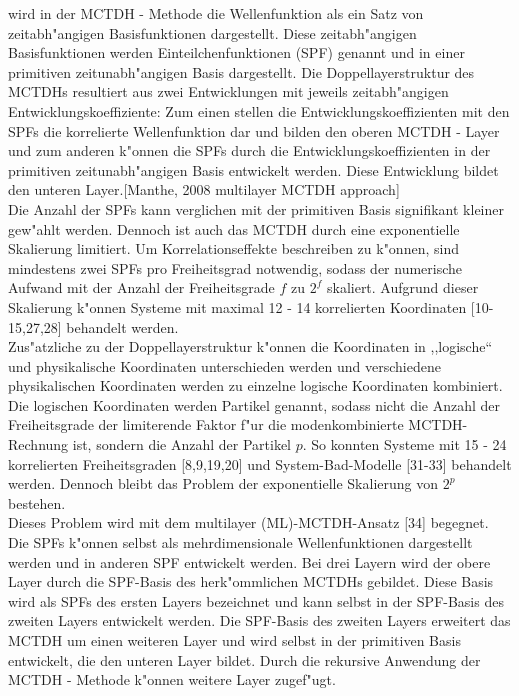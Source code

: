 wird in der MCTDH - Methode die Wellenfunktion als ein Satz von zeitabh"angigen Basisfunktionen dargestellt.
Diese zeitabh"angigen Basisfunktionen werden Einteilchenfunktionen (SPF) genannt und in einer primitiven zeitunabh"angigen Basis dargestellt.
Die Doppellayerstruktur des MCTDHs resultiert aus zwei Entwicklungen mit jeweils zeitabh"angigen Entwicklungskoeffiziente:
Zum einen stellen die Entwicklungskoeffizienten mit den SPFs die korrelierte Wellenfunktion dar und bilden den oberen MCTDH -
Layer und zum anderen k"onnen die SPFs durch die Entwicklungskoeffizienten in der primitiven zeitunabh"angigen Basis entwickelt werden. Diese Entwicklung bildet
den unteren Layer.[Manthe, 2008 multilayer MCTDH approach]
  \\ Die Anzahl der SPFs kann verglichen mit der primitiven Basis signifikant kleiner gew"ahlt werden.
Dennoch ist auch das MCTDH durch eine exponentielle Skalierung limitiert.
Um Korrelationseffekte beschreiben zu k"onnen, sind mindestens zwei SPFs pro Freiheitsgrad notwendig, sodass der numerische Aufwand mit der Anzahl der
Freiheitsgrade $f$ zu $2^f$ skaliert. Aufgrund dieser Skalierung k"onnen Systeme mit maximal 12 - 14 korrelierten Koordinaten [10-15,27,28] behandelt werden.
  \\ Zus"atzliche zu der Doppellayerstruktur k"onnen die Koordinaten in ,,logische`` und physikalische Koordinaten unterschieden werden und
verschiedene physikalischen Koordinaten werden zu einzelne logische Koordinaten kombiniert. Die logischen Koordinaten werden Partikel genannt, sodass
nicht die Anzahl der Freiheitsgrade der limiterende Faktor f"ur die modenkombinierte MCTDH-Rechnung ist,
sondern die Anzahl der Partikel $p$. So konnten Systeme mit 15 - 24 korrelierten Freiheitsgraden [8,9,19,20] und System-Bad-Modelle [31-33] behandelt werden.
Dennoch bleibt das Problem der exponentielle Skalierung von $2^p$ bestehen.
  \\Dieses Problem wird mit dem multilayer (ML)-MCTDH-Ansatz [34] begegnet.
Die SPFs k"onnen selbst als mehrdimensionale Wellenfunktionen dargestellt werden und in anderen SPF entwickelt werden.
Bei drei Layern wird der obere Layer durch die SPF-Basis des herk"ommlichen MCTDHs gebildet.
Diese Basis wird als SPFs des ersten Layers bezeichnet und kann selbst in der SPF-Basis des zweiten Layers entwickelt werden.
Die SPF-Basis des zweiten Layers erweitert das MCTDH um einen weiteren Layer und wird selbst in der primitiven Basis entwickelt, die den unteren Layer bildet.
Durch die rekursive Anwendung der MCTDH - Methode k"onnen weitere Layer zugef"ugt.

